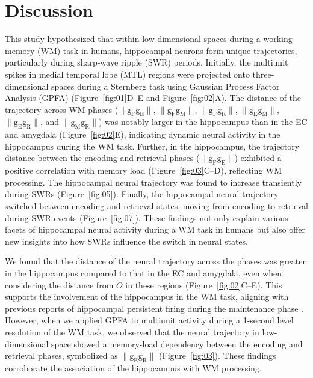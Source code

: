 \documentclass[final,3p,times,twocolumn]{elsarticle}
\begin{document}
\section{Discussion}
This study hypothesized that within low-dimensional spaces during a working memory (WM) task in humans, hippocampal neurons form unique trajectories, particularly during sharp-wave ripple (SWR) periods. Initially, the multiunit spikes in medial temporal lobe (MTL) regions were projected onto three-dimensional spaces during a Sternberg task using Gaussian Process Factor Analysis (GPFA) (Figure~\ref{fig:01}D--E and Figure~\ref{fig:02}A). The distance of the trajectory across WM phases ($\mathrm{\lVert g_{F}g_{E} \rVert}$, $\mathrm{\lVert g_{F}g_{M} \rVert}$, $\mathrm{\lVert g_{F}g_{R} \rVert}$, $\mathrm{\lVert g_{E}g_{M} \rVert}$, $\mathrm{\lVert g_{E}g_{R} \rVert}$, and $\mathrm{\lVert g_{M}g_{R} \rVert}$) was notably larger in the hippocampus than in the EC and amygdala (Figure~\ref{fig:02}E), indicating dynamic neural activity in the hippocampus during the WM task. Further, in the hippocampus, the trajectory distance between the encoding and retrieval phases ($\mathrm{\lVert g_{F}g_{E} \rVert}$) exhibited a positive correlation with memory load (Figure~\ref{fig:03}C--D), reflecting WM processing. The hippocampal neural trajectory was found to increase transiently during SWRs (Figure~\ref{fig:05}). Finally, the hippocampal neural trajectory switched between encoding and retrieval states, moving from encoding to retrieval during SWR events (Figure~\ref{fig:07}). These findings not only explain various facets of hippocampal neural activity during a WM task in humans but also offer new insights into how SWRs influence the switch in neural states.

We found that the distance of the neural trajectory across the phases was greater in the hippocampus compared to that in the EC and amygdala, even when considering the distance from $O$ in these regions (Figure~\ref{fig:02}C--E). This supports the involvement of the hippocampus in the WM task, aligning with previous reports of hippocampal persistent firing during the maintenance phase \cite{boran_persistent_2019} \cite{kaminski_persistently_2017} \cite{kornblith_persistent_2017} \cite{faraut_dataset_2018}. However, when we applied GPFA to multiunit activity during a 1-second level resolution of the WM task, we observed that the neural trajectory in low-dimensional space showed a memory-load dependency between the encoding and retrieval phases, symbolized as $\mathrm{\lVert g_{E}g_{R} \rVert}$ (Figure~\ref{fig:03}). These findings corroborate the association of the hippocampus with WM processing.
\end{document}
